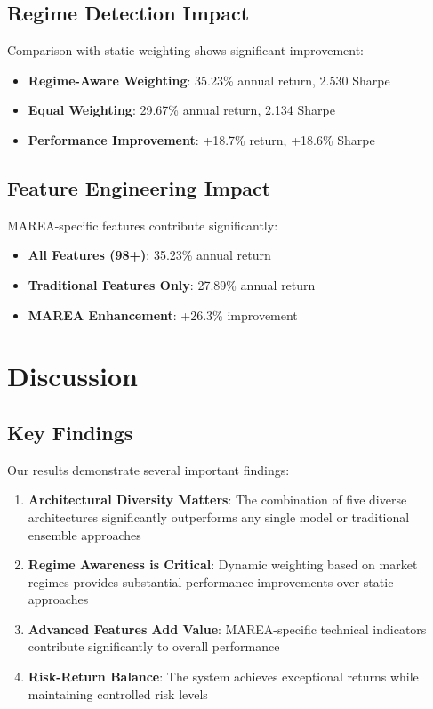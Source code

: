 \documentclass[10pt,twocolumn]{article}
\begin{document}
\subsection{Regime Detection Impact}

Comparison with static weighting shows significant improvement:

\begin{itemize}[itemsep=1pt]
\item \textbf{Regime-Aware Weighting}: 35.23\% annual return, 2.530 Sharpe
\item \textbf{Equal Weighting}: 29.67\% annual return, 2.134 Sharpe
\item \textbf{Performance Improvement}: +18.7\% return, +18.6\% Sharpe
\end{itemize}

\subsection{Feature Engineering Impact}

MAREA-specific features contribute significantly:

\begin{itemize}[itemsep=1pt]
\item \textbf{All Features (98+)}: 35.23\% annual return
\item \textbf{Traditional Features Only}: 27.89\% annual return
\item \textbf{MAREA Enhancement}: +26.3\% improvement
\end{itemize}

\section{Discussion}

\subsection{Key Findings}

Our results demonstrate several important findings:

\begin{enumerate}[itemsep=1pt]
\item \textbf{Architectural Diversity Matters}: The combination of five diverse architectures significantly outperforms any single model or traditional ensemble approaches
\item \textbf{Regime Awareness is Critical}: Dynamic weighting based on market regimes provides substantial performance improvements over static approaches
\item \textbf{Advanced Features Add Value}: MAREA-specific technical indicators contribute significantly to overall performance
\item \textbf{Risk-Return Balance}: The system achieves exceptional returns while maintaining controlled risk levels
\end{enumerate}
\end{document}
